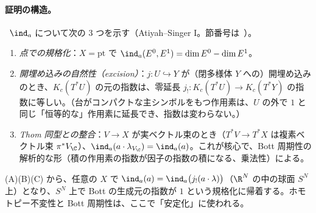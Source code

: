 \paragraph{証明の構造。}\tC\ $\ind_a$ について次の 3 つを示す（Atiyah--Singer I。節番号は\tQ\ ）。
\begin{enumerate}
\item[(A)] \emph{点での規格化}：$X=\mathrm{pt}$ で $\ind_a(E^0,E^1)=\dim E^0-\dim E^1$。
\item[(B)] \emph{開埋め込みの自然性（excision）}：$j:U\hookrightarrow Y$ が（閉多様体 $Y$ への）開埋め込みのとき、$K_c(T^*U)$ の元の指数は、零延長 $j_!:K_c(T^*U)\to K_c(T^*Y)$ の指数に等しい。（台がコンパクトな主シンボルをもつ作用素は、$U$ の外で $1$ と同じ「恒等的な」作用素に延長でき、指数は変わらない。）
\item[(C)] \emph{Thom 同型との整合}：$V\to X$ が実ベクトル束のとき（$T^*V\to T^*X$ は複素ベクトル束 $\pi^*V_{\C}$）、$\ind_a(a\cdot\lambda_{V_{\C}})=\ind_a(a)$。これが核心で、Bott 周期性の解析的な形（積の作用素の指数が因子の指数の積になる、乗法性）による。
\end{enumerate}
(A)(B)(C) から、任意の $X$ で $\ind_a(a)=\ind_a\bigl(j_!(a\cdot\lambda)\bigr)$（$\R^N$ の中の球面 $S^N$ 上）となり、$S^N$ 上で Bott の生成元の指数が $1$ という規格化に帰着する。ホモトピー不変性と Bott 周期性は、ここで「安定化」に使われる。

